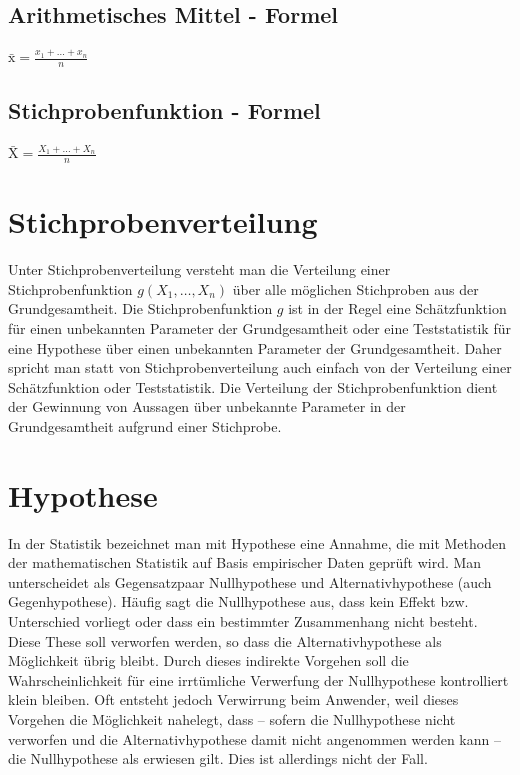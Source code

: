 \subsection{Arithmetisches Mittel - Formel}
{\Large{$\bar{\mathrm{x}} = \frac{x_1 + \ldots + x_n}{n}$}}
\subsection{Stichprobenfunktion - Formel}
{\Large{$\bar{\mathrm{X}} = \frac{X_1 + \ldots + X_n}{n}$}}

\section{Stichprobenverteilung}
Unter Stichprobenverteilung versteht man die Verteilung einer Stichprobenfunktion ${\displaystyle g(X_{1},\dotsc ,X_{n})}$ über alle möglichen Stichproben aus der Grundgesamtheit. Die Stichprobenfunktion ${\displaystyle g}$ ist in der Regel eine Schätzfunktion für einen unbekannten Parameter der Grundgesamtheit oder eine Teststatistik für eine Hypothese über einen unbekannten Parameter der Grundgesamtheit. Daher spricht man statt von Stichprobenverteilung auch einfach von der Verteilung einer Schätzfunktion oder Teststatistik. Die Verteilung der Stichprobenfunktion dient der Gewinnung von Aussagen über unbekannte Parameter in der Grundgesamtheit aufgrund einer Stichprobe.

\section{Hypothese}
In der Statistik bezeichnet man mit Hypothese eine Annahme, die mit Methoden der mathematischen Statistik auf Basis empirischer Daten geprüft wird. Man unterscheidet als Gegensatzpaar Nullhypothese und Alternativhypothese (auch Gegenhypothese). Häufig sagt die Nullhypothese aus, dass kein Effekt bzw. Unterschied vorliegt oder dass ein bestimmter Zusammenhang nicht besteht. Diese These soll verworfen werden, so dass die Alternativhypothese als Möglichkeit übrig bleibt. Durch dieses indirekte Vorgehen soll die Wahrscheinlichkeit für eine irrtümliche Verwerfung der Nullhypothese kontrolliert klein bleiben. Oft entsteht jedoch Verwirrung beim Anwender, weil dieses Vorgehen die Möglichkeit nahelegt, dass – sofern die Nullhypothese nicht verworfen und die Alternativhypothese damit nicht angenommen werden kann – die Nullhypothese als erwiesen gilt. Dies ist allerdings nicht der Fall.

